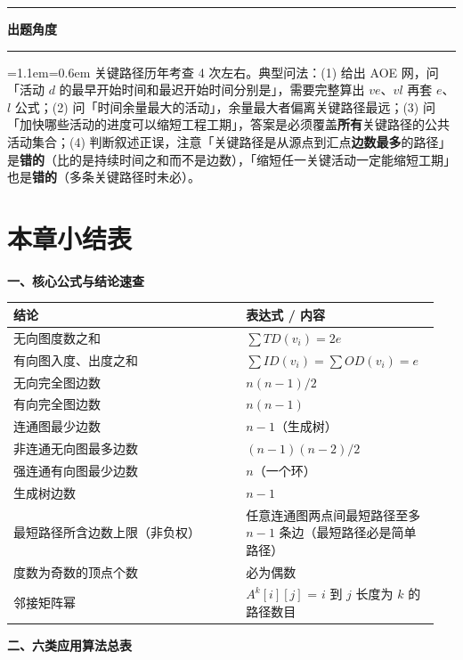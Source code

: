 \documentclass[11pt,openany,UTF8]{ctexbook}
\newcommand{\callouthead}[2]{%
  \par\addvspace{7pt}\noindent
  {\color{#1}\rule[-0.15em]{3pt}{1.05em}}\hspace{0.5em}%
  {\bfseries\color{#1}#2}\par\nobreak\vspace{-0.35em}%
  {\color{rulesep}\hrule height 0.4pt}\nobreak\vspace{0.45em}%
  \begingroup\small\setlength{\parindent}{0pt}%
  \leftskip=1.1em\rightskip=0.6em\noindent\ignorespaces}
\newcommand{\calloutend}{\par\endgroup\addvspace{7pt}}
\newenvironment{callexam}[1]{\callouthead{exambar}{#1}}{\calloutend}
\begin{document}
\begin{callexam}{出题角度}
关键路径历年考查 4 次左右。典型问法：(1) 给出 AOE 网，问「活动 $d$ 的最早开始时间和最迟开始时间分别是」，需要完整算出 $ve$、$vl$ 再套 $e$、$l$ 公式；(2) 问「时间余量最大的活动」，余量最大者偏离关键路径最远；(3) 问「加快哪些活动的进度可以缩短工程工期」，答案是必须覆盖\textbf{所有}关键路径的公共活动集合；(4) 判断叙述正误，注意「关键路径是从源点到汇点\textbf{边数最多}的路径」是\textbf{错的}（比的是持续时间之和而不是边数），「缩短任一关键活动一定能缩短工期」也是\textbf{错的}（多条关键路径时未必）。

\end{callexam}

\section*{本章小结表}

\textbf{一、核心公式与结论速查}

\begingroup\small\setlength{\tabcolsep}{4.0pt}
\begin{longtable}{@{}L{0.5266\linewidth}L{0.4191\linewidth}@{}}
\toprule
\textbf{结论} & \textbf{表达式 / 内容} \\
\midrule
\endhead
无向图度数之和 & $\sum TD(v_i)=2e$ \\
有向图入度、出度之和 & $\sum ID(v_i)=\sum OD(v_i)=e$ \\
无向完全图边数 & $n(n-1)/2$ \\
有向完全图边数 & $n(n-1)$ \\
连通图最少边数 & $n-1$（生成树） \\
非连通无向图最多边数 & $(n-1)(n-2)/2$ \\
强连通有向图最少边数 & $n$（一个环） \\
生成树边数 & $n-1$ \\
最短路径所含边数上限（非负权） & 任意连通图两点间最短路径至多 $n-1$ 条边（最短路径必是简单路径） \\
度数为奇数的顶点个数 & 必为偶数 \\
邻接矩阵幂 & $A^{k}[i][j]$ = $i$ 到 $j$ 长度为 $k$ 的路径数目 \\
\bottomrule
\end{longtable}
\endgroup

\textbf{二、六类应用算法总表}
\end{document}
